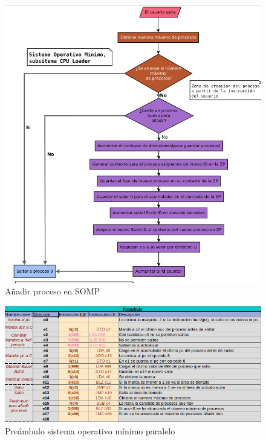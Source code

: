 \documentclass[letterpaper,12pt,oneside]{book}
\begin{document}
		 	
			\begin{figure}[h]		
				\centering
				\includegraphics[scale=0.45]{media/Paralela/Diagrama_SOP_add_process.png}
				\caption{ Añadir proceso en SOMP}
				\label{fig:diag_sop_add_process}
			\end{figure}	 		 			

	 		

			\begin{figure}[h]		
				\centering
				\includegraphics[scale=0.55]{media/Paralela/somp_preambulo.png}
				\caption{ Preámbulo sistema operativo mínimo paralelo}
				\label{fig:somp_preambulo}
			\end{figure}	
			
\end{document}
